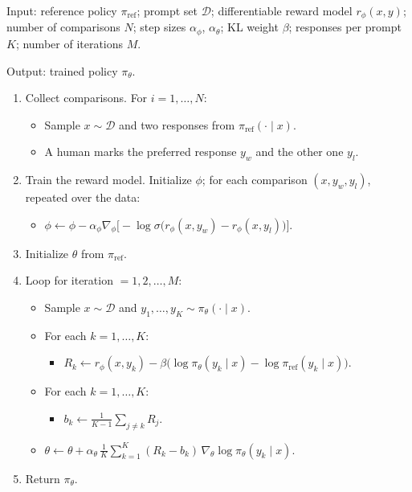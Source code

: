 \begin{implnote}
Input: reference policy $\pi_{\text{ref}}$; prompt set $\mathcal{D}$; differentiable reward model $r_\phi(x,y)$; number of comparisons $N$; step sizes $\alpha_\phi$, $\alpha_\theta$; KL weight $\beta$; responses per prompt $K$; number of iterations $M$.

Output: trained policy $\pi_\theta$.

\begin{enumerate}
\item Collect comparisons. For $i=1,\ldots,N$:
\begin{itemize}
\item Sample $x\sim\mathcal{D}$ and two responses from $\pi_{\text{ref}}(\cdot\mid x)$.
\item A human marks the preferred response $y_w$ and the other one $y_l$.
\end{itemize}
\item Train the reward model. Initialize $\phi$; for each comparison $(x,y_w,y_l)$, repeated over the data:
\begin{itemize}
\item $\phi\leftarrow\phi-\alpha_\phi\nabla_\phi\bigl[-\log\sigma\bigl(r_\phi(x,y_w)-r_\phi(x,y_l)\bigr)\bigr]$.
\end{itemize}
\item Initialize $\theta$ from $\pi_{\text{ref}}$.
\item Loop for iteration $=1,2,\ldots,M$:
\begin{itemize}
\item Sample $x\sim\mathcal{D}$ and $y_1,\ldots,y_K\sim\pi_\theta(\cdot\mid x)$.
\item For each $k=1,\ldots,K$:
\begin{itemize}
\item $R_k\leftarrow r_\phi(x,y_k)-\beta\bigl(\log\pi_\theta(y_k\mid x)-\log\pi_{\text{ref}}(y_k\mid x)\bigr)$.
\end{itemize}
\item For each $k=1,\ldots,K$:
\begin{itemize}
\item $b_k\leftarrow\frac{1}{K-1}\sum_{j\neq k}R_j$.
\end{itemize}
\item $\theta\leftarrow\theta+\alpha_\theta\,\frac{1}{K}\sum_{k=1}^{K}(R_k-b_k)\,\nabla_\theta\log\pi_\theta(y_k\mid x)$.
\end{itemize}
\item Return $\pi_\theta$.
\end{enumerate}

\end{implnote}

